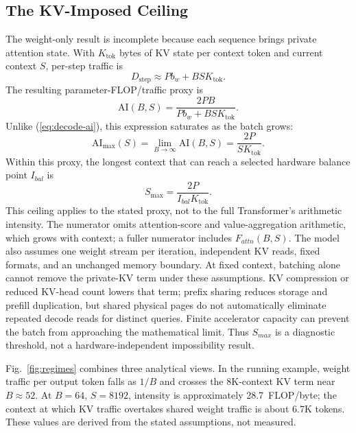 \documentclass[journal]{IEEEtran}
\newcommand{\AI}{\ensuremath{\mathrm{AI}}}
\begin{document}
\subsection{The KV-Imposed Ceiling}
The weight-only result is incomplete because each sequence brings private attention state. With $K_{\mathrm{tok}}$ bytes of KV state per context token and current context $S$, per-step traffic is
\begin{equation}
D_{\mathrm{step}}\approx Pb_w+B S K_{\mathrm{tok}}.
\label{eq:step-traffic}
\end{equation}
The resulting parameter-FLOP/traffic proxy is
\begin{equation}
\AI(B,S)=\frac{2PB}{Pb_w+B S K_{\mathrm{tok}}}.
\label{eq:ai-kv}
\end{equation}
Unlike (\ref{eq:decode-ai}), this expression saturates as the batch grows:
\begin{equation}
\AI_{\max}(S)=\lim_{B\to\infty}\AI(B,S)=\frac{2P}{S K_{\mathrm{tok}}}.
\label{eq:ai-ceiling}
\end{equation}
Within this proxy, the longest context that can reach a selected hardware balance point $I_{bal}$ is
\begin{equation}
S_{\max}=\frac{2P}{I_{bal}K_{\mathrm{tok}}}.
\label{eq:smax}
\end{equation}
This ceiling applies to the stated proxy, not to the full Transformer's arithmetic intensity. The numerator omits attention-score and value-aggregation arithmetic, which grows with context; a fuller numerator includes $F_{attn}(B,S)$. The model also assumes one weight stream per iteration, independent KV reads, fixed formats, and an unchanged memory boundary. At fixed context, batching alone cannot remove the private-KV term under these assumptions. KV compression or reduced KV-head count lowers that term; prefix sharing reduces storage and prefill duplication, but shared physical pages do not automatically eliminate repeated decode reads for distinct queries. Finite accelerator capacity can prevent the batch from approaching the mathematical limit. Thus $S_{max}$ is a diagnostic threshold, not a hardware-independent impossibility result.

Fig.~\ref{fig:regimes} combines three analytical views. In the running example, weight traffic per output token falls as $1/B$ and crosses the 8K-context KV term near $B\approx52$. At $B=64$, $S=8192$, intensity is approximately \SI{28.7}{FLOP/byte}; the context at which KV traffic overtakes shared weight traffic is about 6.7K tokens. These values are derived from the stated assumptions, not measured.
\end{document}

